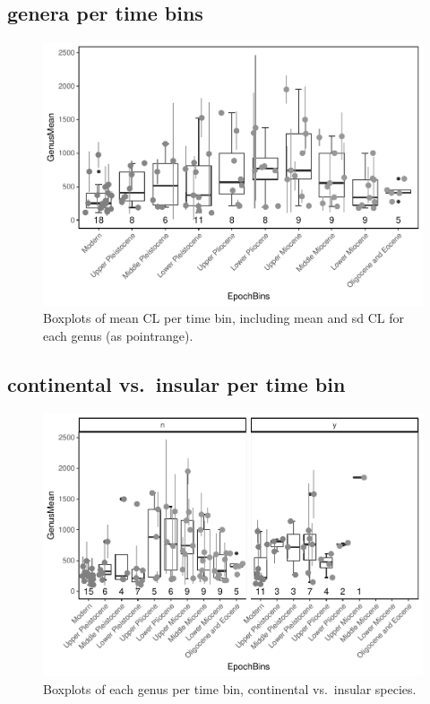 \documentclass[]{article}
\begin{document}
\subsection{genera per time bins}\label{genera-per-time-bins}

\begin{figure}[htbp]
\centering
\includegraphics{MA_JJ_files/figure-latex/Boxplots of each genus per time bin-1.pdf}
\caption{Boxplots of mean CL per time bin, including mean and sd CL for
each genus (as pointrange).}
\end{figure}

\newpage

\subsection{continental vs.~insular per time
bin}\label{continental-vs.insular-per-time-bin}

\begin{figure}[htbp]
\centering
\includegraphics{MA_JJ_files/figure-latex/Boxplots of each genus per time bin, continental vs. insular-1.pdf}
\caption{Boxplots of each genus per time bin, continental vs.~insular
species.}
\end{figure}
\end{document}
